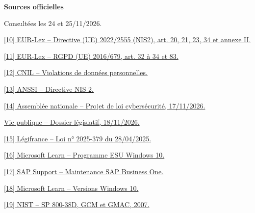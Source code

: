 \documentclass[11pt,a4paper]{article}
\begin{document}
\begin{minipage}[t]{0.48\textwidth}
\raggedright
{\large\bfseries\color{teal} Sources officielles}\par
{\footnotesize\color{graytext} Consultées les 24 et 25/11/2026.}\par
\href{https://eur-lex.europa.eu/legal-content/FR/ALL/?uri=CELEX:32022L2555}{[10] EUR-Lex -- Directive (UE) 2022/2555 (NIS2), art. 20, 21, 23, 34 et annexe II.}\par
\href{https://eur-lex.europa.eu/eli/reg/2016/679/oj?locale=fr}{[11] EUR-Lex -- RGPD (UE) 2016/679, art. 32 à 34 et 83.}\par
\href{https://www.cnil.fr/fr/violations-de-donnees-personnelles-les-regles-suivre}{[12] CNIL -- Violations de données personnelles.}\par
\href{https://messervices.cyber.gouv.fr/nis2}{[13] ANSSI -- Directive NIS 2.}\par
\href{https://www.assemblee-nationale.fr/dyn/actualites-accueil-hub/adoption-du-projet-de-loi-relatif-a-la-resilience-des-infrastructures-critiques-et-au-renforcement-de-la-cybersecurite}{[14] Assemblée nationale -- Projet de loi cybersécurité, 17/11/2026.}\par
\href{https://www.vie-publique.fr/dossierlegislatif/JORFDOLE000050349138}{Vie publique -- Dossier législatif, 18/11/2026.}\par
\href{https://www.legifrance.gouv.fr/loda/id/JORFTEXT000051528207}{[15] Légifrance -- Loi n° 2025-379 du 28/04/2025.}\par
\href{https://learn.microsoft.com/fr-fr/windows/whats-new/extended-security-updates}{[16] Microsoft Learn -- Programme ESU Windows 10.}\par
\href{https://support.sap.com/en/offerings-programs/support-small-medium-enterprises/business-one/maintenance.html}{[17] SAP Support -- Maintenance SAP Business One.}\par
\href{https://learn.microsoft.com/fr-fr/windows/release-health/release-information}{[18] Microsoft Learn -- Versions Windows 10.}\par
\href{https://csrc.nist.gov/pubs/sp/800/38/d/final}{[19] NIST -- SP 800-38D, GCM et GMAC, 2007.}\par
\end{minipage}
\endgroup
\end{document}
